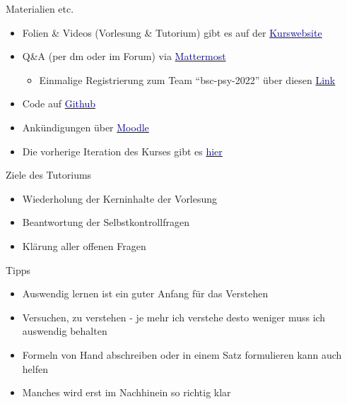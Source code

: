 \documentclass[
  8pt,
  ignorenonframetext,
]{beamer}
\providecommand{\tightlist}{%
  \setlength{\itemsep}{0pt}\setlength{\parskip}{0pt}}
\begin{document}
\begin{frame}{Materialien etc.}
\protect\hypertarget{materialien-etc.}{}

\begin{itemize}
\tightlist
\item
  Folien \& Videos (Vorlesung \& Tutorium) gibt es auf der
  \href{https://www.ipsy.ovgu.de/Institut/Abteilungen+des+Institutes/Methodenlehre+I+_+Experimentelle+und+Neurowissenschaftliche+Psychologie/Lehre/Sommersemester+2023/Allgemeines+Lineares+Modell.html}{\textcolor{darkblue}{Kurswebsite}}
\item
  Q\&A (per dm oder im Forum) via
  \href{https://mm.cs.ovgu.de/bsc-psy-2022/channels/b2-alm}{\textcolor{darkblue}{Mattermost}}

  \begin{itemize}
  \tightlist
  \item
    Einmalige Registrierung zum Team ``bsc-psy-2022'' über diesen
    \href{https://mm.cs.ovgu.de/signup_user_complete/?id=6zhrsn3oab8pdynz16gmqpm9ka}{\textcolor{darkblue}{Link}}
  \end{itemize}
\item
  Code auf \href{Link\%20zu\%20Github}{\textcolor{darkblue}{Github}}
\item
  Ankündigungen über
  \href{https://elearning.ovgu.de/course/view.php?id=14470}{\textcolor{darkblue}{Moodle}}
\item
  Die vorherige Iteration des Kurses gibt es
  \href{https://www.ipsy.ovgu.de/Institut/Abteilungen+des+Institutes/Methodenlehre+I+_+Experimentelle+und+Neurowissenschaftliche+Psychologie/Lehre/Sommersemester+2022/Allgemeines+Lineares+Modell.html}{\textcolor{darkblue}{hier}}
\end{itemize}
\end{frame}

\begin{frame}{Ziele des Tutoriums}
\protect\hypertarget{ziele-des-tutoriums}{}

\begin{itemize}
\tightlist
\item
  Wiederholung der Kerninhalte der Vorlesung
\item
  Beantwortung der Selbstkontrollfragen
\item
  Klärung aller offenen Fragen
\end{itemize}
\end{frame}

\begin{frame}{Tipps}
\protect\hypertarget{tipps}{}

\begin{itemize}
\tightlist
\item
  Auswendig lernen ist ein guter Anfang für das Verstehen
\item
  Versuchen, zu verstehen - je mehr ich verstehe desto weniger muss ich
  auswendig behalten
\item
  Formeln von Hand abschreiben oder in einem Satz formulieren kann auch
  helfen
\item
  Manches wird erst im Nachhinein so richtig klar
\end{itemize}
\end{frame}
\end{document}
